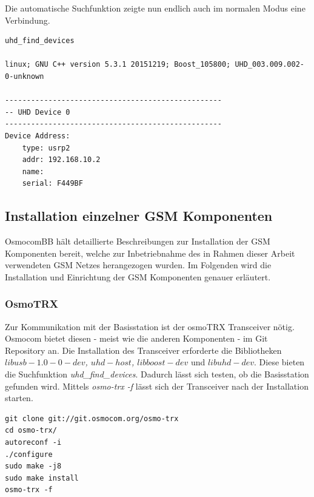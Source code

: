 Die automatische Suchfunktion zeigte nun endlich auch im normalen Modus eine Verbindung.
\begin{lstlisting}
uhd_find_devices

linux; GNU C++ version 5.3.1 20151219; Boost_105800; UHD_003.009.002-0-unknown

--------------------------------------------------
-- UHD Device 0
--------------------------------------------------
Device Address:
    type: usrp2
    addr: 192.168.10.2
    name: 
    serial: F449BF
\end{lstlisting}

\subsection{Installation einzelner GSM Komponenten}\label{GSM_Komp_Osmocom}
OsmocomBB hält detaillierte Beschreibungen zur Installation der GSM Komponenten bereit, welche zur Inbetriebnahme des in Rahmen dieser Arbeit verwendeten GSM Netzes herangezogen wurden. Im Folgenden wird die Installation und Einrichtung der GSM Komponenten genauer erläutert. 

\subsubsection{OsmoTRX}
Zur Kommunikation mit der Basisstation ist der osmoTRX Transceiver nötig. Osmocom bietet diesen - meist wie die anderen Komponenten - im Git Repository an. Die Installation des Transceiver erforderte die Bibliotheken \textit{$libusb-1.0-0-dev$, $uhd-host$, $libboost-dev$} und \textit{$libuhd-dev$}. Diese bieten die Suchfunktion \textit{uhd\_find\_devices}. Dadurch lässt sich testen, ob die Basisstation gefunden wird. Mittels \textit{osmo-trx -f} lässt sich der Transceiver nach der Installation starten.

\begin{lstlisting}
git clone git://git.osmocom.org/osmo-trx
cd osmo-trx/
autoreconf -i
./configure
sudo make -j8
sudo make install
osmo-trx -f
\end{lstlisting}

